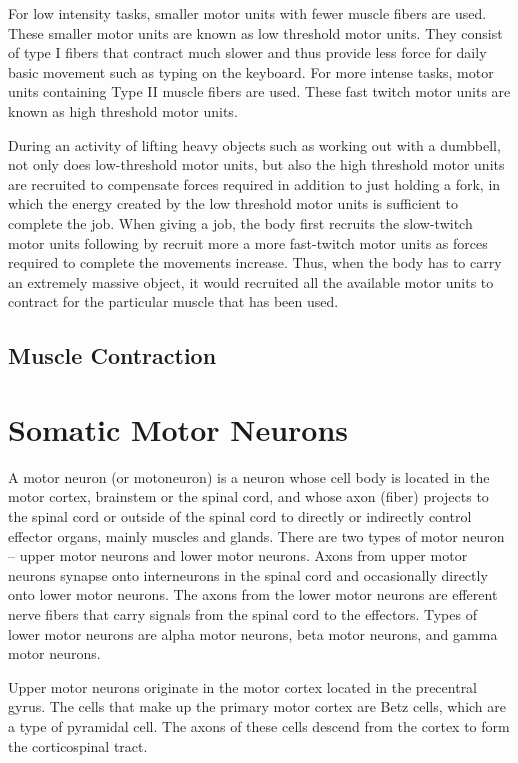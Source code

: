 For low intensity tasks, smaller motor units with fewer muscle fibers are used. These smaller motor units are known as low threshold motor units. They consist of type I fibers that contract much slower and thus provide less force for daily basic movement such as typing on the keyboard. For more intense tasks, motor units containing Type II muscle fibers are used. These fast twitch motor units are known as high threshold motor units.

During an activity of lifting heavy objects such as working out with a dumbbell, not only does low-threshold motor units, but also the high threshold motor units are recruited to compensate forces required in addition to just holding a fork, in which the energy created by the low threshold motor units is sufficient to complete the job. When giving a job, the body first recruits the slow-twitch motor units following by recruit more a more fast-twitch motor units as forces required to complete the movements increase. Thus, when the body has to carry an extremely massive object, it would recruited all the available motor units to contract for the particular muscle that has been used.

\hypertarget{muscle-contraction}{%
\subsection{Muscle Contraction}\label{muscle-contraction}}

\hypertarget{somatic-motor-neurons}{%
\section{Somatic Motor Neurons}\label{somatic-motor-neurons}}

A motor neuron (or motoneuron) is a neuron whose cell body is located in the motor cortex, brainstem or the spinal cord, and whose axon (fiber) projects to the spinal cord or outside of the spinal cord to directly or indirectly control effector organs, mainly muscles and glands. There are two types of motor neuron -- upper motor neurons and lower motor neurons. Axons from upper motor neurons synapse onto interneurons in the spinal cord and occasionally directly onto lower motor neurons. The axons from the lower motor neurons are efferent nerve fibers that carry signals from the spinal cord to the effectors. Types of lower motor neurons are alpha motor neurons, beta motor neurons, and gamma motor neurons.

Upper motor neurons originate in the motor cortex located in the precentral gyrus. The cells that make up the primary motor cortex are Betz cells, which are a type of pyramidal cell. The axons of these cells descend from the cortex to form the corticospinal tract.

